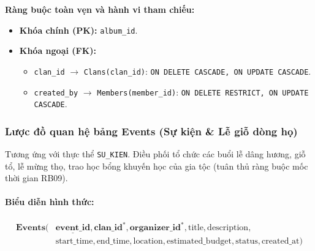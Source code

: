 \noindent\textbf{Ràng buộc toàn vẹn và hành vi tham chiếu:}
\begin{itemize}[noitemsep,topsep=2pt]
    \item \textbf{Khóa chính (PK):} \texttt{album\_id}.
    \item \textbf{Khóa ngoại (FK):}
    \begin{itemize}[noitemsep]
        \item \texttt{clan\_id} $\rightarrow$ \texttt{Clans(clan\_id)}: \texttt{ON DELETE CASCADE, ON UPDATE CASCADE}.
        \item \texttt{created\_by} $\rightarrow$ \texttt{Members(member\_id)}: \texttt{ON DELETE RESTRICT, ON UPDATE CASCADE}.
    \end{itemize}
\end{itemize}

\subsubsection{Lược đồ quan hệ bảng Events (Sự kiện \& Lễ giỗ dòng họ)}
Tương ứng với thực thể \texttt{SU\_KIEN}. Điều phối tổ chức các buổi lễ dâng hương, giỗ tổ, lễ mừng thọ, trao học bổng khuyến học của gia tộc (tuân thủ ràng buộc mốc thời gian RB09).

\paragraph{Biểu diễn hình thức:}
\[
\begin{aligned}
\textbf{Events}\big(
&\underline{\textbf{event\_id}}, \textbf{clan\_id}^*, \textbf{organizer\_id}^*, \text{title}, \text{description}, \\
&\text{start\_time}, \text{end\_time}, \text{location}, \text{estimated\_budget}, \text{status}, \text{created\_at}
\big)
\end{aligned}
\]

